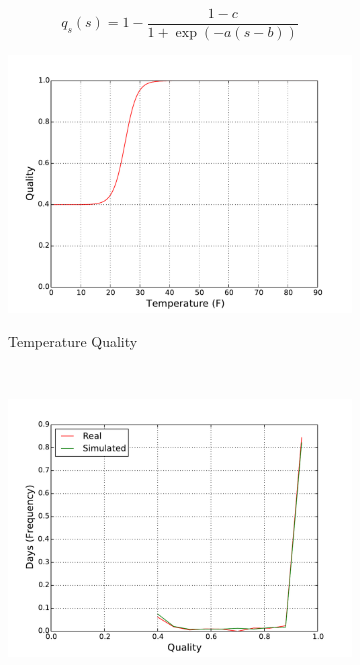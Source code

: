 \documentclass[11pt, letterpaper]{article}
\begin{document}
\begin{equation}
q_s(s) = 1 - \frac{1 - c}{1 + \exp(-a (s - b))}
\end{equation}



\begin{figure}[H]
  \centering
  \begin{subfigure}[b]{0.45\textwidth}
    \includegraphics[width=\textwidth]{figures/temp_quality.pdf}
    \label{fig:analysis-raw}
    \caption{Temperature Quality}
  \end{subfigure}
  ~
  \begin{subfigure}[b]{0.45\textwidth}
    \includegraphics[width=\textwidth]{figures/daily_temp_quality_hist.pdf}

\end{subfigure}
\end{figure}
\end{document}

